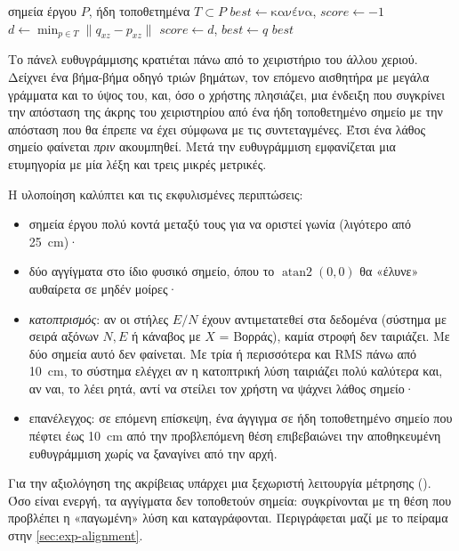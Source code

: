 \begin{algorithm}[htbp]
  \caption{Πρόταση επόμενου σημείου ελέγχου (farthest point).}
  \label{alg:suggest-next}
  \begin{algorithmic}[1]
    \Require σημεία έργου $P$, ήδη τοποθετημένα $T \subset P$
    \State $best \gets \text{κανένα}$, $score \gets -1$
      \State $d \gets \min_{p \in T} \lVert q_{xz} - p_{xz} \rVert$
       $score \gets d$, $best \gets q$ \EndIf
    \EndFor
    \State \Return $best$
  \end{algorithmic}
\end{algorithm}

Το πάνελ ευθυγράμμισης κρατιέται πάνω από το χειριστήριο του άλλου χεριού. Δείχνει ένα βήμα-βήμα οδηγό τριών βημάτων, τον επόμενο αισθητήρα με μεγάλα γράμματα και το ύψος του, και, όσο ο χρήστης πλησιάζει, μια ένδειξη που συγκρίνει την απόσταση της άκρης του χειριστηρίου από ένα ήδη τοποθετημένο σημείο με την απόσταση που θα έπρεπε να έχει σύμφωνα με τις συντεταγμένες. Έτσι ένα λάθος σημείο φαίνεται \emph{πριν} ακουμπηθεί. Μετά την ευθυγράμμιση εμφανίζεται μια ετυμηγορία με μία λέξη και τρεις μικρές μετρικές.

Η υλοποίηση καλύπτει και τις εκφυλισμένες περιπτώσεις:
\begin{itemize}
  \item σημεία έργου πολύ κοντά μεταξύ τους για να οριστεί γωνία (λιγότερο από \SI{25}{cm})·
  \item δύο αγγίγματα στο ίδιο φυσικό σημείο, όπου το $\operatorname{atan2}(0,0)$ θα «έλυνε» αυθαίρετα σε μηδέν μοίρες·
  \item \emph{κατοπτρισμός}: αν οι στήλες $E/N$ έχουν αντιμετατεθεί στα δεδομένα (σύστημα με σειρά αξόνων $N, E$ ή κάναβος με $X$ = Βορράς), καμία στροφή δεν ταιριάζει. Με δύο σημεία αυτό δεν φαίνεται. Με τρία ή περισσότερα και RMS πάνω από \SI{10}{cm}, το σύστημα ελέγχει αν η κατοπτρική λύση ταιριάζει πολύ καλύτερα και, αν ναι, το λέει ρητά, αντί να στείλει τον χρήστη να ψάχνει λάθος σημείο·
  \item επανέλεγχος: σε επόμενη επίσκεψη, ένα άγγιγμα σε ήδη τοποθετημένο σημείο που πέφτει έως \SI{10}{cm} από την προβλεπόμενη θέση επιβεβαιώνει την αποθηκευμένη ευθυγράμμιση χωρίς να ξαναγίνει από την αρχή.
\end{itemize}

Για την αξιολόγηση της ακρίβειας υπάρχει μια ξεχωριστή λειτουργία μέτρησης (). Όσο είναι ενεργή, τα αγγίγματα δεν τοποθετούν σημεία: συγκρίνονται με τη θέση που προβλέπει η «παγωμένη» λύση και καταγράφονται. Περιγράφεται μαζί με το πείραμα στην \cref{sec:exp-alignment}.

